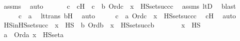 \begin{isabellebody}
\ assms\ \isamarkupfalse%
\ auto\ \isanewline
\ \ \isamarkupfalse%
\ \isamarkupfalse%
\ c\ \ cH\ {\isacharcolon}{\kern0pt}\ {\isachardoublequoteopen}c\ {\isacharless}{\kern0pt}\ b{\isachardoublequoteclose}\ {\isachardoublequoteopen}Ord{\isacharparenleft}{\kern0pt}c{\isacharparenright}{\kern0pt}\ {\isasymand}\ x\ {\isasymin}\ HS{\isacharunderscore}{\kern0pt}set{\isacharparenleft}{\kern0pt}succ{\isacharparenleft}{\kern0pt}c{\isacharparenright}{\kern0pt}{\isacharparenright}{\kern0pt}{\isachardoublequoteclose}\ \isamarkupfalse%
\ assms\ ltD\ \isamarkupfalse%
\ blast\ \ \isanewline
\ \ \isamarkupfalse%
\ \isamarkupfalse%
\ {\isachardoublequoteopen}c\ {\isacharless}{\kern0pt}\ a{\isachardoublequoteclose}\ \isamarkupfalse%
\ lt{\isacharunderscore}{\kern0pt}trans\ bH\ \isamarkupfalse%
\ auto\isanewline
\ \ \isamarkupfalse%
\ \isamarkupfalse%
\ {\isachardoublequoteopen}{\isasymexists}c\ {\isacharless}{\kern0pt}\ a{\isachardot}{\kern0pt}\ Ord{\isacharparenleft}{\kern0pt}c{\isacharparenright}{\kern0pt}\ {\isasymand}\ x\ {\isasymin}\ HS{\isacharunderscore}{\kern0pt}set{\isacharparenleft}{\kern0pt}succ{\isacharparenleft}{\kern0pt}c{\isacharparenright}{\kern0pt}{\isacharparenright}{\kern0pt}{\isachardoublequoteclose}\ \isamarkupfalse%
\ cH\ \isamarkupfalse%
\ auto\ \isanewline
{}\isamarkupfalse%
%
\endisatagproof
{\isafoldproof}%
%
\isadelimproof
\isanewline
%
\endisadelimproof
\isanewline
{}\isamarkupfalse%
\ HS{\isacharunderscore}{\kern0pt}in{\isacharunderscore}{\kern0pt}HS{\isacharunderscore}{\kern0pt}set{\isacharunderscore}{\kern0pt}succ\ {\isacharcolon}{\kern0pt}\ {\isachardoublequoteopen}x\ {\isasymin}\ HS\ {\isasymLongrightarrow}\ {\isasymexists}b{\isachardot}{\kern0pt}\ Ord{\isacharparenleft}{\kern0pt}b{\isacharparenright}{\kern0pt}\ {\isasymand}\ x\ {\isasymin}\ HS{\isacharunderscore}{\kern0pt}set{\isacharparenleft}{\kern0pt}succ{\isacharparenleft}{\kern0pt}b{\isacharparenright}{\kern0pt}{\isacharparenright}{\kern0pt}{\isachardoublequoteclose}\ \isanewline
%
\isadelimproof
%
\endisadelimproof
%
\isatagproof
{}\isamarkupfalse%
\ {\isacharminus}{\kern0pt}\ \isanewline
\ \ \isamarkupfalse%
\ {\isachardoublequoteopen}x\ {\isasymin}\ HS{\isachardoublequoteclose}\ \isanewline
\ \ \isamarkupfalse%
\ \isamarkupfalse%
\ a\ \ {\isachardoublequoteopen}Ord{\isacharparenleft}{\kern0pt}a{\isacharparenright}{\kern0pt}{\isachardoublequoteclose}\ {\isachardoublequoteopen}x\ {\isasymin}\ HS{\isacharunderscore}{\kern0pt}set{\isacharparenleft}{\kern0pt}a{\isacharparenright}{\kern0pt}{\isachardoublequoteclose}\ \isamarkupfalse%

\end{isabellebody}
